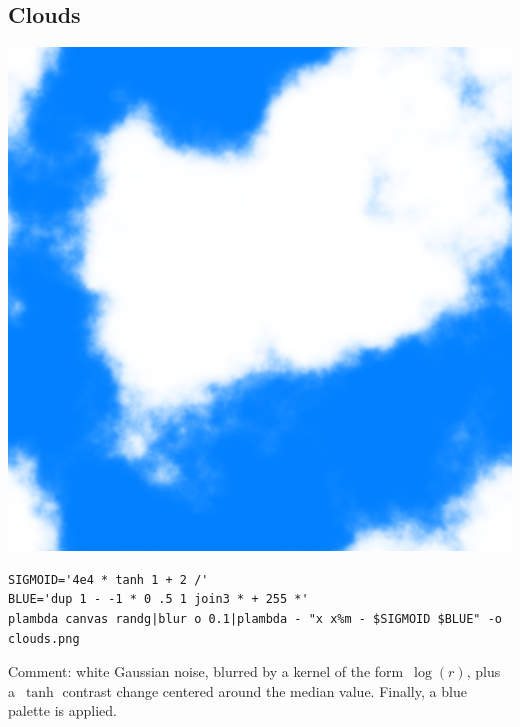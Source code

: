 \subsection{Clouds}
\includegraphics{clouds.png}
\begin{verbatim}
SIGMOID='4e4 * tanh 1 + 2 /'
BLUE='dup 1 - -1 * 0 .5 1 join3 * + 255 *'
plambda canvas randg|blur o 0.1|plambda - "x x%m - $SIGMOID $BLUE" -o clouds.png
\end{verbatim}
Comment: white Gaussian noise, blurred by a kernel of the form~$\log(r)$, plus a~$\tanh$ contrast change centered around the median value.  Finally, a blue palette is applied.

